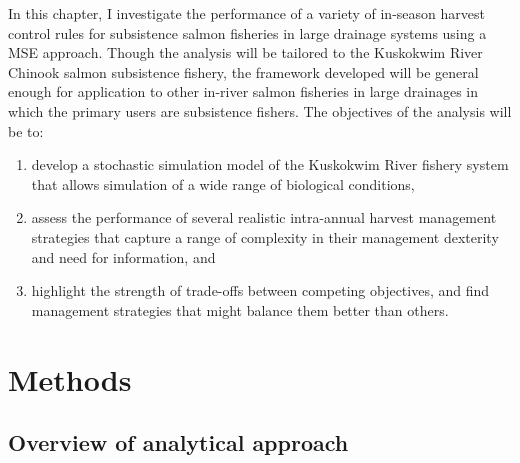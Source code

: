 \documentclass[12pt,]{book}
\theoremstyle{definition}
\theoremstyle{definition}
\theoremstyle{definition}
\theoremstyle{remark}
\begin{document}
In this chapter, I investigate the performance of a variety of in-season
harvest control rules for subsistence salmon fisheries in large drainage
systems using a MSE approach. Though the analysis will be tailored to
the Kuskokwim River Chinook salmon subsistence fishery, the framework
developed will be general enough for application to other in-river
salmon fisheries in large drainages in which the primary users are
subsistence fishers. The objectives of the analysis will be to:

\begin{enumerate}
\def\labelenumi{(\arabic{enumi})}
\item
  develop a stochastic simulation model of the Kuskokwim River fishery
  system that allows simulation of a wide range of biological
  conditions,
\item
  assess the performance of several realistic intra-annual harvest
  management strategies that capture a range of complexity in their
  management dexterity and need for information, and
\item
  highlight the strength of trade-offs between competing objectives, and
  find management strategies that might balance them better than others.
\end{enumerate}

\section{Methods}\label{methods}

\subsection{Overview of analytical
approach}\label{overview-of-analytical-approach}
\end{document}
